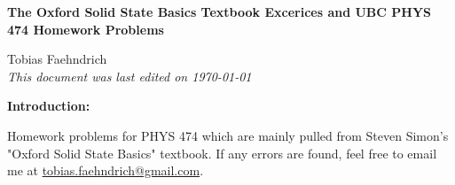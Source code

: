 \documentclass[10pt]{article}
\begin{document}
\begin{tcolorbox}
  \begin{center}
  \begin{Large}
    \textbf{The Oxford Solid State Basics Textbook Excerices and UBC PHYS 474 Homework Problems} \\
    \vspace{5pt}
  \end{Large}
  \begin{large}
        Tobias Faehndrich \\
\vspace{5pt}
    \emph{This document was last edited on \today}
  \end{large}
  \end{center}
\end{tcolorbox}

\begin{center}
  \textbf{Introduction:}

Homework problems for PHYS 474 which are mainly pulled from Steven Simon's "Oxford Solid State Basics" textbook. If any errors are found, feel free to email me at \href{mailto:tobias.faehndrich@gmail.com}{tobias.faehndrich@gmail.com}.

\end{center}
\tableofcontents

\newpage


\newpage


\newpage

\end{document}
